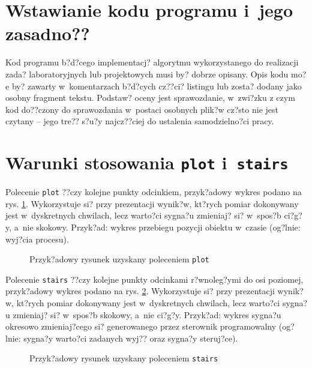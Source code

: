\section{Wstawianie kodu programu i~jego zasadno??}
Kod programu b?d?cego implementacj? algorytmu wykorzystanego do realizacji zada? laboratoryjnych lub projektowych musi by? dobrze opisany. Opis kodu mo?e by? zawarty w~komentarzach b?d?cych cz??ci? listingu lub zosta? dodany jako osobny fragment tekstu. Podstaw? oceny jest sprawozdanie, w~zwi?zku z czym kod do??czony do sprawozdania w~postaci osobnych plik?w cz?sto nie jest czytany -- jego tre?? s?u?y najcz??ciej do ustalenia samodzielno?ci pracy.

\section{Warunki stosowania \texttt{plot} i~\texttt{stairs}}
Polecenie \verb+plot+ ??czy kolejne punkty odcinkiem, przyk?adowy wykres podano na rys. \ref{r_plot}. Wykorzystuje si? przy prezentacji wynik?w, kt?rych pomiar dokonywany jest w~dyskretnych chwilach, lecz warto?ci sygna?u zmieniaj? si? w~spos?b ci?g?y, a~nie skokowy. Przyk?ad: wykres przebiegu pozycji obiektu w~czasie (og?lnie: wyj?cia procesu).

\begin{figure}[H]
\centering
	\setlength{}
	\setlength{}
	
\caption{Przyk?adowy rysunek uzyskany poleceniem \texttt{plot}}
\label{r_plot}
\end{figure}

Polecenie \verb+stairs+ ??czy kolejne punkty odcinkami r?wnoleg?ymi do osi poziomej, przyk?adowy wykres podano na rys. \ref{r_stairs}. Wykorzystuje si? przy prezentacji wynik?w, kt?rych pomiar dokonywany jest w~dyskretnych chwilach, lecz warto?ci sygna?u zmieniaj? si? w~spos?b skokowy, a~nie ci?g?y. Przyk?ad: wykres sygna?u okresowo zmieniaj?cego si? generowanego przez sterownik programowalny (og?lnie: sygna?y warto?ci zadanych wyj?? oraz sygna?y steruj?ce).

\begin{figure}[H]
\centering
	\setlength{}
	\setlength{}
	
\caption{Przyk?adowy rysunek uzyskany poleceniem \texttt{stairs}}
\label{r_stairs}
\end{figure}

